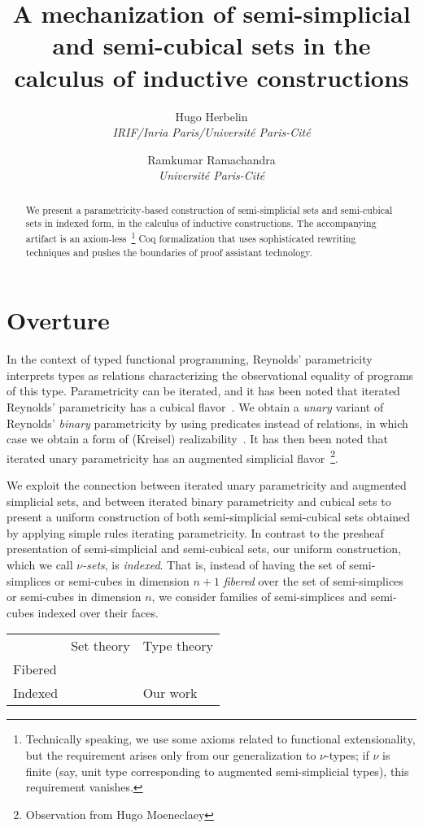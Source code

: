 \documentclass[10pt]{art.cls/art}
\title{A mechanization of semi-simplicial and semi-cubical sets in the calculus of inductive constructions}
\author{
  \textcolor{gray80}{Hugo Herbelin} \\
  \itshape \textcolor{gray80}{IRIF/Inria Paris/Université Paris-Cité}
  \and
  \textcolor{gray80}{Ramkumar Ramachandra} \\
  \itshape \textcolor{gray80}{Université Paris-Cité}
}
\date{}
\def\graymidrule{\arrayrulecolor{gray30}\midrule\arrayrulecolor{gray65}}
\begin{document}
\maketitle
\begin{abstract}
  We present a parametricity-based construction of semi-simplicial sets and semi-cubical sets in indexed form, in the calculus of inductive constructions. The accompanying artifact is an axiom-less~\footnote{Technically speaking, we use some axioms related to functional extensionality, but the requirement arises only from our generalization to $\nu$-types; if $\nu$ is finite (say, unit type corresponding to augmented semi-simplicial types), this requirement vanishes.} Coq formalization that uses sophisticated rewriting techniques and pushes the boundaries of proof assistant technology.
\end{abstract}
\tableofcontents
\newpage

\section{Overture}
In the context of typed functional programming, Reynolds' parametricity~\cite{reynolds72} interprets types as relations characterizing the observational equality of programs of this type. Parametricity can be iterated, and it has been noted that iterated Reynolds' parametricity has a cubical flavor~\cite{johann17,altenkirch15,moulin16}. We obtain a \emph{unary} variant of Reynolds' \emph{binary} parametricity by using predicates instead of relations, in which case we obtain a form of (Kreisel) realizability~\cite{bernardy12,moulin16}. It has then been noted that iterated unary parametricity has an augmented simplicial flavor~\footnote{Observation from Hugo Moeneclaey}.

We exploit the connection between iterated unary parametricity and augmented simplicial sets, and between iterated binary parametricity and cubical sets to present a uniform construction of both semi-simplicial semi-cubical sets obtained by applying simple rules iterating parametricity.  In contrast to the presheaf presentation of semi-simplicial and semi-cubical sets, our uniform construction, which we call \emph{$\nu$-sets}, is \emph{indexed}. That is, instead of having the set of semi-simplices or semi-cubes in dimension $n+1$
\emph{fibered} over the set of semi-simplices or semi-cubes in dimension $n$, we consider families of semi-simplices and semi-cubes indexed over their faces.

\begin{table}[H]
  \begin{tabularx}{\linewidth}{p{.3\linewidth}|p{.3\linewidth}|p{.3\linewidth}}
    \toprule
            & Set theory  & Type theory \\
    \graymidrule
    Fibered & \cite{cchm} &             \\
    \graymidrule
    Indexed &             & Our work    \\
    \bottomrule
  \end{tabularx}
\end{table}
\end{document}
